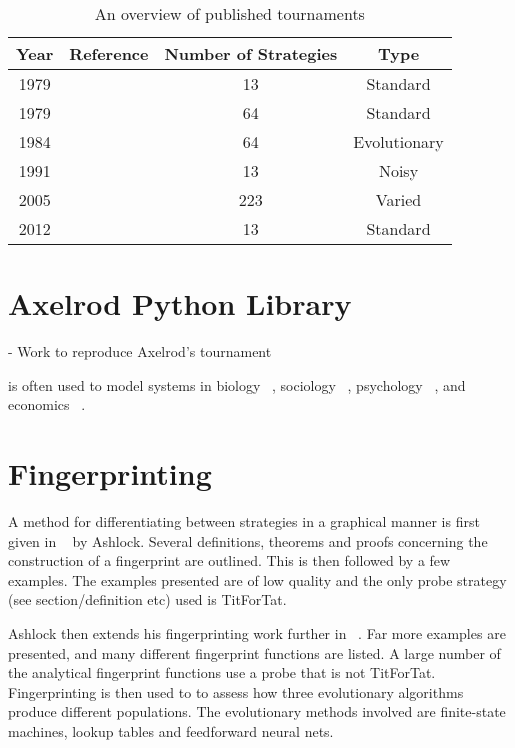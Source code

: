 \begin{table}[htbp]
\centering
\begin{tabular}{c c c c}
Year & Reference & Number of Strategies & Type\\
\hline
1979 & & 13 & Standard\\
1979 & & 64 & Standard\\
1984 & & 64 & Evolutionary\\
1991 & & 13 & Noisy\\
2005 & & 223 & Varied\\
2012 & & 13 & Standard\\
\hline
\end{tabular}
\label{tab:tournament_refs}
\caption{An overview of published tournaments}
\end{table}

\section{Axelrod Python Library}

- Work to reproduce Axelrod's tournament ~\cite{Knight2016}



is often used to model systems in biology ~\cite{Sigmund1999}, sociology ~\cite{Franken2005},
psychology ~\cite{Ishibuchi2005}, and economics ~\cite{Chong2005}.


\section{Fingerprinting}\label{sec:fingerprinting}

A method for differentiating between strategies in a graphical manner is first given in ~\cite{Ashlock2004} by Ashlock.
Several definitions, theorems and proofs concerning the construction of a fingerprint are outlined.
This is then followed by a few examples.
The examples presented are of low quality and the only probe strategy (see section/definition etc) used is TitForTat.

Ashlock then extends his fingerprinting work further in ~\cite{Ashlock2008}.
Far more examples are presented, and many different fingerprint functions are listed.
A large number of the analytical fingerprint functions use a probe that is not TitForTat.
Fingerprinting is then used to to assess how three evolutionary algorithms produce different populations.
The evolutionary methods involved are finite-state machines, lookup tables and feedforward neural nets.


